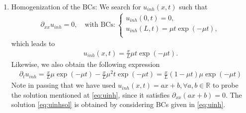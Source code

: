 \documentclass[12pt]{article}
\begin{document}
\begin{enumerate}
	\item Homogenization of the BCs: We search for $u_{inh}(x,t)$ such that
	      \begin{align}
		      \label{eq:uinh}
		      \partial_{xx}u_{inh} = 0, \quad \text{with BCs:}\ 
		      \begin{cases}
			      u_{inh}(0,t) = 0,                  \\
			      u_{inh}(L,t) = \mu t \exp(-\mu t), \\
		      \end{cases}
	      \end{align}
	      which leads to
	      \begin{align}
		      \label{eq:uinhsol}
		      \boxed{
			      u_{inh}(x,t) = \frac{x}{L}\mu t \exp(-\mu t).
		      }
	      \end{align}
	      Likewise, we also obtain the following expression
	      \begin{align}
		      \label{eq:ptuinh}
		      \partial_{t}u_{inh} 
		      = \frac{x}{L}\mu \exp(-\mu t) - \frac{x}{L}\mu^{2} t \exp(-\mu t)
		      = \frac{x}{L}(1-\mu t)\mu \exp(-\mu t)
	      \end{align}
	      Note in passing that we have used $u_{inh}(x,t) = ax+b, \forall a,b \in\mathbb{R}$
	      to probe the solution mentioned at \eqref{eq:uinh}, since it satisfies $\partial_{xx}(ax+b) = 0$.
	      The solution \eqref{eq:uinhsol} is obtained by considering BCs given in \eqref{eq:uinh}.
	      

\end{enumerate}
\end{document}
